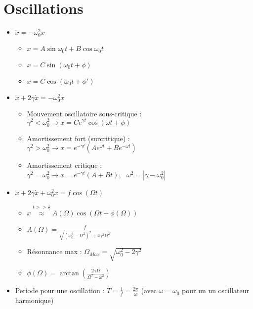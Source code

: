 \documentclass[../main.tex]{subfiles}
\begin{document}
\section{Oscillations}
\begin{itemize}
  \item \(\ddot{x}=-\omega_0^2x\)
    \begin{itemize}
      \item \(x=A\sin\omega_0t + B\cos\omega_0t\)
      \item \(x=C\sin(\omega_0t+\phi)\)
      \item \(x=C\cos(\omega_0t+\phi')\)
    \end{itemize}
  \item \(\ddot{x}+2\gamma\dot{x}=-\omega_0^2x\)
    \begin{itemize}
      \item Mouvement oscillatoire sous-critique :\\ \(\gamma^2 < \omega_0^2 \rightarrow x = Ce^{\gamma t}\cos(\omega t + \phi)\)
      \item Amortissement fort (surcritique) :\\ \(\gamma^2 > \omega_0^2 \rightarrow x = e^{-\gamma t}(Ae^{\omega t} + Be^{-\omega t})\)
      \item Amortissement critique :\\ \(\gamma^2 = \omega^2_0 \rightarrow x = e^{-\gamma t}(A+Bt),\,\,\,\, \omega^2=|\gamma - \omega_0^2|\)
    \end{itemize}
  \item \(\ddot{x} + 2\gamma\dot{x} + \omega_0^2x=f\cos(\Omega t)\)
    \begin{itemize}
      \item \(x \overset{t>>\frac{1}{\gamma}}{\approx} A(\Omega)\cos(\Omega t + \phi(\Omega))\)
      \item \(A(\Omega)=\frac{f}{\sqrt{(\omega_0^2 - \Omega^2)^2 + 4\gamma^2\Omega^2}}\)
      \item Résonnance max : \(\Omega_{Max} = \sqrt{\omega_0^2 - 2\gamma^2}\)
      \item \(\phi(\Omega) = \arctan(\frac{2\gamma\Omega}{\Omega^2 - \omega^2})\)
    \end{itemize}
  \item Periode pour une oscillation : \(T=\frac{1}{f}=\frac{2\pi}{\omega}\) (avec \(\omega = \omega_0\) pour un un oscillateur harmonique)
\end{itemize}
\end{document}
